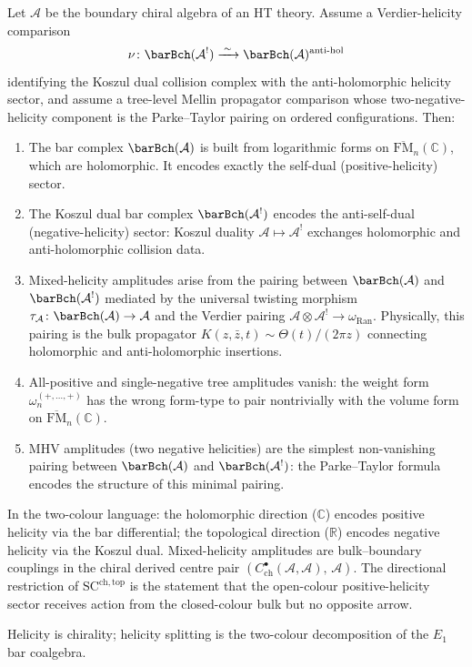 \begin{theorem}
\label{thm:ch-core-helicity-splitting}
Let $\mathcal A$ be the boundary chiral algebra of an HT theory. Assume a Verdier-helicity
comparison
\[
\nu\colon \barBch(\mathcal A^!)\xrightarrow{\;\sim\;}
\barBch(\mathcal A)^{\mathrm{anti\text{-}hol}}
\]
identifying the Koszul dual collision complex with the anti-holomorphic helicity sector, and
assume a tree-level Mellin propagator comparison whose two-negative-helicity component is the
Parke--Taylor pairing on ordered configurations. Then:
\begin{enumerate}[label=\textup{(\roman*)}]
\item The bar complex $\barBch(\mathcal{A})$ is built from logarithmic forms on $\overline{\mathrm{FM}}_n(\mathbb{C})$, which are holomorphic. It encodes exactly the self-dual (positive-helicity) sector.
\item The Koszul dual bar complex $\barBch(\mathcal{A}^!)$ encodes the anti-self-dual (negative-helicity) sector: Koszul duality $\mathcal{A} \mapsto \mathcal{A}^!$ exchanges holomorphic and anti-holomorphic collision data.
\item Mixed-helicity amplitudes arise from the pairing between
$\barBch(\mathcal{A})$ and $\barBch(\mathcal{A}^!)$ mediated by the
universal twisting morphism
$\tau_{\mathcal A}\colon \barBch(\mathcal{A}) \to \mathcal{A}$
and the Verdier pairing
$\mathcal{A}\otimes\mathcal{A}^!\to\omega_{\operatorname{Ran}}$.
Physically, this pairing is the bulk propagator
$K(z,\bar z,t) \sim \Theta(t)/(2\pi z)$ connecting holomorphic and
anti-holomorphic insertions.
\item All-positive and single-negative tree amplitudes vanish: the weight form $\omega_n^{(+,\ldots,+)}$ has the wrong form-type to pair nontrivially with the volume form on $\overline{\mathrm{FM}}_n(\mathbb{C})$.
\item MHV amplitudes (two negative helicities) are the simplest non-vanishing pairing between $\barBch(\mathcal{A})$ and $\barBch(\mathcal{A}^!)$: the Parke--Taylor formula encodes the structure of this minimal pairing.
\end{enumerate}
In the two-colour language: the holomorphic direction ($\mathbb{C}$) encodes positive helicity via the bar differential; the topological direction ($\mathbb{R}$) encodes negative helicity via the Koszul dual. Mixed-helicity amplitudes are bulk--boundary couplings in the chiral derived centre pair $(C^\bullet_{\mathrm{ch}}(\mathcal{A},\mathcal{A}),\, \mathcal{A})$. The directional restriction of $\mathrm{SC}^{\mathrm{ch,top}}$ is the statement that the open-colour positive-helicity sector receives action from the closed-colour bulk but no opposite arrow.

Helicity is chirality; helicity splitting is the two-colour decomposition of the $E_1$ bar coalgebra.
\end{theorem}

